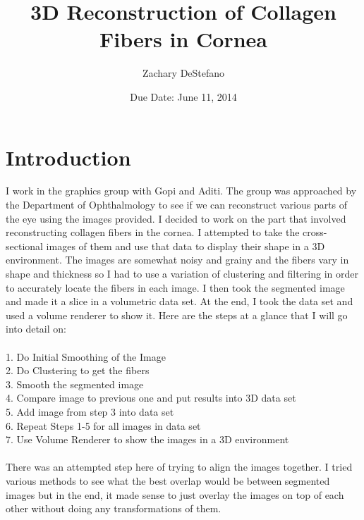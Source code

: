 \documentclass[11pt,psfig]{article}
\begin{document}
\setlength{\parskip}{1.2ex plus0.3ex minus 0.3ex}


\thispagestyle{empty} \pagestyle{myheadings} 



\title{3D Reconstruction of Collagen Fibers in Cornea}
\author{Zachary DeStefano}
\date{Due Date: June 11, 2014}

\maketitle

\vfill\eject

\newpage

\section*{Introduction}

I work in the graphics group with Gopi and Aditi. The group was approached by the Department of Ophthalmology to see if we can reconstruct various parts of the eye using the images provided. I decided to work on the part that involved reconstructing collagen fibers in the cornea. I attempted to take the cross-sectional images of them and use that data to display their shape in a 3D environment. The images are somewhat noisy and grainy and the fibers vary in shape and thickness so I had to use a variation of clustering and filtering in order to accurately locate the fibers in each image. I then took the segmented image and made it a slice in a volumetric data set. At the end, I took the data set and used a volume renderer to show it. Here are the steps at a glance that I will go into detail on: \\
\\
1. Do Initial Smoothing of the Image \\
2. Do Clustering to get the fibers\\
3. Smooth the segmented image\\
4. Compare image to previous one and put results into 3D data set\\
5. Add image from step 3 into data set\\
6. Repeat Steps 1-5 for all images in data set\\
7. Use Volume Renderer to show the images in a 3D environment\\
\\
There was an attempted step here of trying to align the images together. I tried various methods to see what the best overlap would be between segmented images but in the end, it made sense to just overlay the images on top of each other without doing any transformations of them. 
\end{document}
